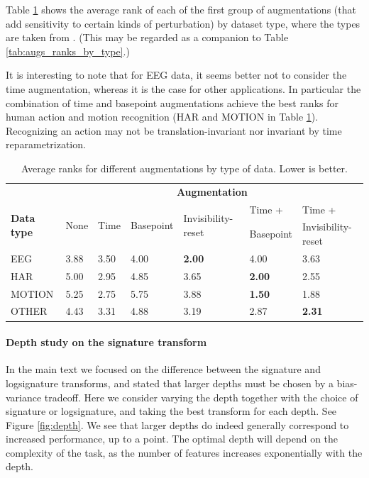 \documentclass{article}
\theoremstyle{definition}
\theoremstyle{remark}
\begin{document}
	Table \ref{tab:basic_augs_ranks_by_type} shows the average rank of each of the first group of augmentations (that add sensitivity to certain kinds of perturbation) by dataset type, where the types are taken from \citet{bagnall2018uea}. (This may be regarded as a companion to Table \ref{tab:augs_ranks_by_type}.)
	
	It is interesting to note that for EEG data, it seems better not to consider the time augmentation, whereas it is the case for other applications. In particular the combination of time and basepoint augmentations achieve the best ranks for human action and motion recognition (HAR and MOTION in Table \ref{tab:basic_augs_ranks_by_type}). Recognizing an action may not be translation-invariant nor invariant by time reparametrization.
	
	\begin{table}[h]
	\caption{Average ranks for different augmentations by type of data. Lower is better.}
	\label{tab:basic_augs_ranks_by_type}
	\centering
		\begin{tabular}{lllllll}
		\toprule
	 & \multicolumn{6}{c}{\textbf{Augmentation}}\\
	 \cmidrule{2-7}
	\multirow{2}{*}{\textbf{Data type}} &\multirow{2}{*}{None } &\multirow{2}{*}{Time} &\multirow{2}{*}{Basepoint}& \multirow{2}{*}{Invisibility-reset}    & Time + & Time +        \\
		& & & & & Basepoint & Invisibility-reset  \\
		\midrule
		EEG & 3.88 & 3.50 & 4.00 & \textbf{2.00} & 4.00 & 3.63 \\
		HAR & 5.00 & 2.95 & 4.85 & 3.65 & \textbf{2.00} & 2.55 \\
		MOTION & 5.25 & 2.75 & 5.75 & 3.88 & \textbf{1.50} & 1.88 \\
		OTHER & 4.43 & 3.31 & 4.88 & 3.19 & 2.87 & \textbf{2.31 } \\ 
		\bottomrule
		\end{tabular}
	\end{table}


	\paragraph{Depth study on the signature transform}
	In the main text we focused on the difference between the signature and logsignature transforms, and stated that larger depths must be chosen by a bias-variance tradeoff. Here we consider varying the depth together with the choice of signature or logsignature, and taking the best transform for each depth. See Figure \ref{fig:depth}. We see that larger depths do indeed generally correspond to increased performance, up to a point. The optimal depth will depend on the complexity of the task, as the number of features increases exponentially with the depth.
	
\end{document}
